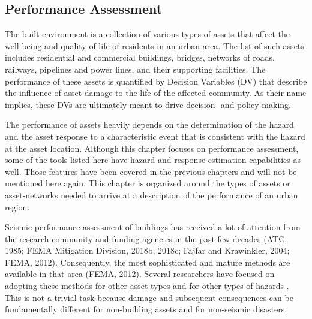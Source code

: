 
\begin{partbacktext}
\part{Performance Assessment}\label{part:Performance}

The built environment is a collection of various types of assets that affect the well-being and quality of life of residents in an urban area. The list of such assets includes residential and commercial buildings, bridges, networks of roads, railways, pipelines and power lines, and their supporting facilities. The performance of these assets is quantified by Decision Variables (DV) that describe the influence of asset damage to the life of the affected community. As their name implies, these DVs are ultimately meant to drive decision- and policy-making.

The performance of assets heavily depends on the determination of the hazard and the asset response to a characteristic event that is consistent with the hazard at the asset location. Although this chapter focuses on performance assessment, some of the tools listed here have hazard and response estimation capabilities as well. Those features have been covered in the previous chapters and will not be mentioned here again. This chapter is organized around the types of assets or asset-networks needed to arrive at a description of the performance of an urban region. 

Seismic performance assessment of buildings has received a lot of attention from the research community and funding agencies in the past few decades (ATC, 1985; FEMA Mitigation Division, 2018b, 2018c; Fajfar and Krawinkler, 2004; FEMA, 2012). Consequently, the most sophisticated and mature methods are available in that area (FEMA, 2012). Several researchers have focused on adopting these methods for other asset types \citep{werner2006redars, chmielewski2016response} and for other types of hazards \citep{FEMA Mitigation Division, 2018c, attary2017performancebased, barbato2013performancebased, lange2014application}. This is not a trivial task because damage and subsequent consequences can be fundamentally different for non-building assets and for non-seismic disasters.  

\end{partbacktext}
